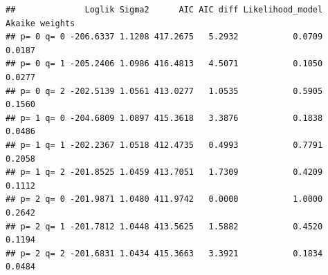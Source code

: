 \documentclass[
  11pt,
]{article}
\newenvironment{Shaded}{\begin{snugshade}}{\end{snugshade}}
\newcommand{\CommentTok}[1]{\textcolor[rgb]{0.56,0.35,0.01}{\textit{#1}}}
\newcommand{\ControlFlowTok}[1]{\textcolor[rgb]{0.13,0.29,0.53}{\textbf{#1}}}
\newcommand{\DataTypeTok}[1]{\textcolor[rgb]{0.13,0.29,0.53}{#1}}
\newcommand{\DecValTok}[1]{\textcolor[rgb]{0.00,0.00,0.81}{#1}}
\newcommand{\FloatTok}[1]{\textcolor[rgb]{0.00,0.00,0.81}{#1}}
\newcommand{\KeywordTok}[1]{\textcolor[rgb]{0.13,0.29,0.53}{\textbf{#1}}}
\newcommand{\NormalTok}[1]{#1}
\newcommand{\OperatorTok}[1]{\textcolor[rgb]{0.81,0.36,0.00}{\textbf{#1}}}
\newcommand{\StringTok}[1]{\textcolor[rgb]{0.31,0.60,0.02}{#1}}
\begin{document}
\begin{Shaded}
\end{Shaded}

\begin{verbatim}
##              Loglik Sigma2      AIC AIC diff Likelihood_model Akaike weights
## p= 0 q= 0 -206.6337 1.1208 417.2675   5.2932           0.0709         0.0187
## p= 0 q= 1 -205.2406 1.0986 416.4813   4.5071           0.1050         0.0277
## p= 0 q= 2 -202.5139 1.0561 413.0277   1.0535           0.5905         0.1560
## p= 1 q= 0 -204.6809 1.0897 415.3618   3.3876           0.1838         0.0486
## p= 1 q= 1 -202.2367 1.0518 412.4735   0.4993           0.7791         0.2058
## p= 1 q= 2 -201.8525 1.0459 413.7051   1.7309           0.4209         0.1112
## p= 2 q= 0 -201.9871 1.0480 411.9742   0.0000           1.0000         0.2642
## p= 2 q= 1 -201.7812 1.0448 413.5625   1.5882           0.4520         0.1194
## p= 2 q= 2 -201.6831 1.0434 415.3663   3.3921           0.1834         0.0484
\end{verbatim}
\end{document}
